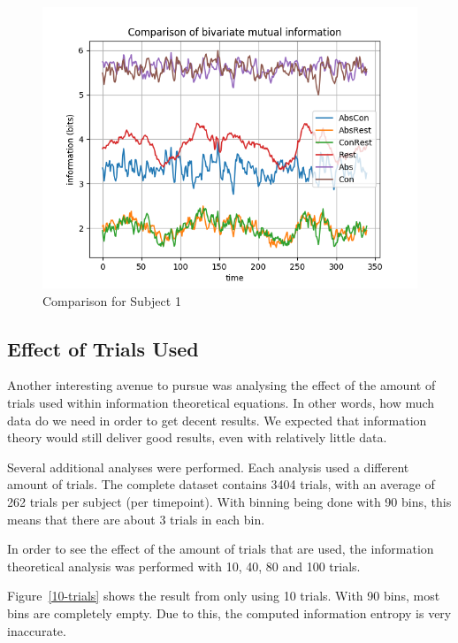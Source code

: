 \begin{figure}[!htb]
\caption{Comparison for Subject 1}
\label{all-trials}
    \centering
    \includegraphics[width=\textwidth]{fig/subject1_alltrials_all-channel-1}
\end{figure}

\subsection{Effect of Trials Used}

Another interesting avenue to pursue was analysing the effect of the amount of trials used within information theoretical equations. In other words, how much data do we need in order to get decent results. We expected that information theory would still deliver good results, even with relatively little data.

Several additional analyses were performed. Each analysis used a different amount of trials. The complete dataset contains 3404 trials, with an average of 262 trials per subject (per timepoint). With binning being done with 90 bins, this means that there are about 3 trials in each bin. 

In order to see the effect of the amount of trials that are used, the information theoretical analysis was performed with 10, 40, 80 and 100 trials. 

Figure~\ref{10-trials} shows the result from only using 10 trials. With 90 bins, most bins are completely empty. Due to this, the computed information entropy is very inaccurate. 

